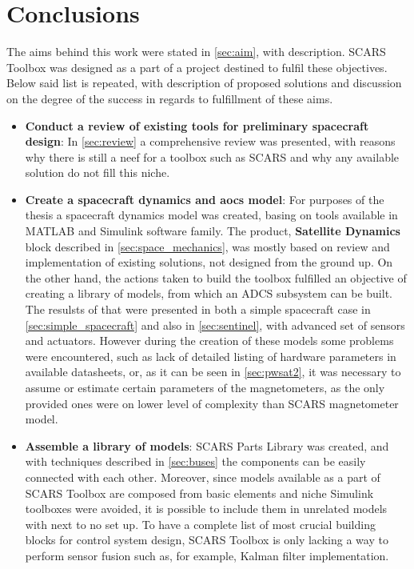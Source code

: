 \section{Conclusions}\label{sec:conclusions}

    The aims behind this work were stated in \autoref{sec:aim}, with description. SCARS Toolbox was designed as a part of a project destined to fulfil these objectives. Below said list is repeated, with description of proposed solutions and discussion on the degree of the success in regards to fulfillment of these aims.
    
    \begin{itemize}
        \item \textbf{Conduct a review of existing tools for preliminary spacecraft design}: In \autoref{sec:review} a comprehensive review was presented, with reasons why there is still a neef for a toolbox such as SCARS and why any available solution do not fill this niche.
        \item \textbf{Create a spacecraft dynamics and \ac{aocs} model}: For purposes of the thesis a spacecraft dynamics model was created, basing on tools available in MATLAB  and Simulink software family. The product, \textbf{Satellite Dynamics} block described in \autoref{sec:space_mechanics}, was mostly based on review and implementation of existing solutions, not designed from the ground up. On the other hand, the actions taken to build the toolbox fulfilled an objective of creating a library of models, from which an ADCS subsystem can be built. The resulsts of that were presented in both a simple spacecraft case in \autoref{sec:simple_spacecraft} and also in \autoref{sec:sentinel}, with advanced set of sensors and actuators. However during the creation of these models some problems were encountered, such as lack of detailed listing of hardware parameters in available datasheets, or, as it can be seen in \autoref{sec:pwsat2}, it was necessary to assume or estimate certain parameters of the magnetometers, as the only provided ones were on lower level of complexity than SCARS magnetometer model.
        \item \textbf{Assemble a library of models}: SCARS Parts Library was created, and with techniques described in \autoref{sec:buses} the components can be easily connected with each other. Moreover, since models available as a part of SCARS Toolbox are composed from basic elements and niche Simulink toolboxes were avoided, it is possible to include them in unrelated models with next to no set up. To have a complete list of most crucial building blocks for control system design, SCARS Toolbox is only lacking a way to perform sensor fusion such as, for example, Kalman filter implementation.

\end{itemize}
